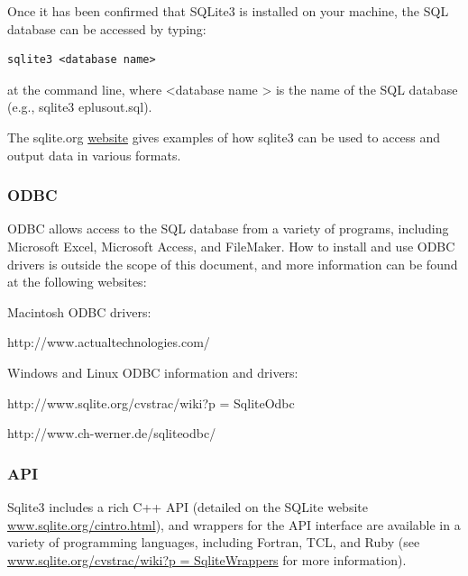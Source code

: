 Once it has been confirmed that SQLite3 is installed on your machine, the SQL database can be accessed by typing:

\begin{lstlisting}
sqlite3 <database name>
\end{lstlisting}

at the command line, where \textless{}database name \textgreater{} is the name of the SQL database (e.g., sqlite3 eplusout.sql).

The sqlite.org \href{http://www.sqlite.org/sqlite.html}{website} gives examples of how sqlite3 can be used to access and output data in various formats.

\subsubsection{ODBC}\label{odbc}

ODBC allows access to the SQL database from a variety of programs, including Microsoft Excel, Microsoft Access, and FileMaker. How to install and use ODBC drivers is outside the scope of this document, and more information can be found at the following websites:

Macintosh ODBC drivers:

http://www.actualtechnologies.com/

Windows and Linux ODBC information and drivers:

http://www.sqlite.org/cvstrac/wiki?p = SqliteOdbc

http://www.ch-werner.de/sqliteodbc/

\subsubsection{API}\label{api}

Sqlite3 includes a rich C++ API (detailed on the SQLite website \href{http://www.sqlite.org/cintro.html}{www.sqlite.org/cintro.html}), and wrappers for the API interface are available in a variety of programming languages, including Fortran, TCL, and Ruby (see \href{http://www.sqlite.org/cvstrac/wiki?p\%20=\%20SqliteWrappers}{www.sqlite.org/cvstrac/wiki?p = SqliteWrappers} for more information).
